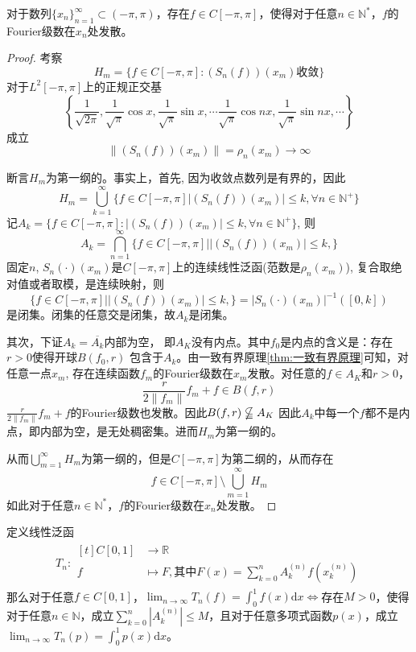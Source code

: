 \documentclass[lang = cn, scheme = chinese, thmcnt = section]{elegantbook}
\newcommand{\N}{\mathbb{N}}            %
\newcommand{\R}{\mathbb{R}}            %
\newcommand{\sub}{\subset}             %
\begin{document}
\begin{corollary}
	对于数列$\{x_n\}_{n=1}^{\infty}\sub(-\pi,\pi)$，存在$f\in C[-\pi,\pi]$，使得对于任意$n\in\N^*$，$f$的Fourier级数在$x_n$处发散。
\end{corollary}

\begin{proof}
	考察
	$$
	H_m=\{ f\in C[-\pi,\pi]:(S_n(f))(x_m)\text{收敛} \}
	$$
	对于$L^2[-\pi,\pi]$上的正规正交基
	$$
	\left\{ \frac{1}{\sqrt{2\pi}},\frac{1}{\sqrt{\pi}}\cos x,\frac{1}{\sqrt{\pi}}\sin x,\cdots \frac{1}{\sqrt{\pi}}\cos nx,\frac{1}{\sqrt{\pi}}\sin nx,\cdots \right\}
	$$
	成立
	$$
	\| (S_n(f))(x_m)\|=\rho_n(x_m)\to\infty
	$$
	
	断言$H_m$为第一纲的。事实上，首先, 因为收敛点数列是有界的，因此
	$$
	H_m=\bigcup_{k=1}^{\infty}\Big\{f \in C[-\pi, \pi]\Big|(S_n(f))(x_m)|\leq k,  \forall n\in \mathbb{N}^{+} \Big\}
	$$
	记$A_{k}=\Big\{f \in C[-\pi, \pi]:\Big|(S_n(f))(x_m)|\leq k,  \forall n\in \mathbb{N}^{+} \Big\}$, 则
	$$
	A_{k}=\bigcap_{n=1}^{\infty}\Big\{f \in C[-\pi, \pi]\Big||(S_n(f))(x_m)|\leq k,  \Big\}
	$$
	固定$n$, $S_{n}(\cdot)(x_{m})$是$C[-\pi, \pi]$上的连续线性泛函(范数是$\rho_{n}(x_{m})$), 复合取绝对值或者取模，是连续映射，则
	$$
	\Big\{f \in C[-\pi, \pi]\Big||(S_n(f))(x_m)|\leq k,  \Big\}=|S_{n}(\cdot)(x_{m})|^{-1}([0, k])
	$$
	是闭集。闭集的任意交是闭集，故$A_{k}$是闭集。
	
	其次，下证$A_{k}=\overline{A_{k}}$内部为空， 即$A_{K}$没有内点。其中$f_{0}$是内点的含义是：存在$r>0$使得开球$B(f_{0}, r)$ 包含于$A_{k}$。由一致有界原理\ref{thm:一致有界原理}可知，对任意一点$x_{m}$, 存在连续函数$f_{m}$的Fourier级数在$x_{m}$发散。对任意的$f\in A_{K}$和$r>0$，
	$$
	\frac{r}{2\|f_{m}\|}f_{m}+f \in B(f, r)
	$$ 
	$\frac{r}{2\|f_{m}\|}f_{m}+f$的Fourier级数也发散。因此$B(f, r)\nsubseteqq A_{K}$
	因此$A_{k}$中每一个$f$都不是内点，即内部为空，是无处稠密集。进而$H_m$为第一纲的。
	
	从而$\displaystyle \bigcup_{m=1}^{\infty}H_m$为第一纲的，但是$C[-\pi,\pi]$为第二纲的，从而存在
	$$
	f\in C[-\pi,\pi]\setminus \bigcup_{m=1}^{\infty}H_m
	$$
	如此对于任意$n\in\N^*$，$f$的Fourier级数在$x_n$处发散。
\end{proof}

\begin{theorem}
	定义线性泛函
	\begin{align*}
		T_n:\begin{aligned}[t]
			C[0,1]&\longrightarrow \R\\
			f&\longmapsto F,\text{其中}F(x)=\sum_{k=0}^{n}A_k^{(n)}f(x_k^{(n)})
		\end{aligned}
	\end{align*}
	那么对于任意$f\in C[0,1]$，$\displaystyle \lim_{n\to\infty}T_n(f)=\int_0^1f(x)\mathrm{d}x\iff$存在$M>0$，使得对于任意$n\in\N$，成立$\displaystyle \sum_{k=0}^{n}|A_k^{(n)}|\le M$，且对于任意多项式函数$p(x)$，成立$\displaystyle \lim_{n\to\infty}T_n(p)=\int_0^1p(x)\mathrm{d}x$。
\end{theorem}
\end{document}
